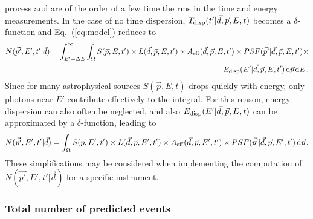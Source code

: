 \documentclass{article}[12pt,a4]
\begin{document}
process and are of the order of a few time the rms in the time and energy measurements.
In the case of no time dispersion, $T_{\rm disp}(t' | \vec{d}, \vec{p}, E, t)$ becomes a $\delta$-function
and Eq.~(\ref{eq:model}) reduces to 
\begin{eqnarray}
N(\vec{p'}, E', t' | \vec{d}) = \int_{E'-\Delta E}^{\infty} \int_{\Omega} 
S(\vec{p}, E, t') \times 
L(\vec{d}, \vec{p}, E, t') \times
A_{\rm eff}(\vec{d}, \vec{p}, E, t') \times
PSF(\vec{p'} | \vec{d}, \vec{p}, E, t') \times \nonumber \\
E_{\rm disp}(E' | \vec{d}, \vec{p}, E, t') 
\, {\rm d}\vec{p} \, {\rm d}E \, .
\end{eqnarray}
Since for many astrophysical sources $S(\vec{p}, E, t)$ drops quickly with energy, only
photons near $E'$ contribute effectively to the integral.
For this reason, energy dispersion can also often be neglected, and also
$E_{\rm disp}(E' | \vec{d}, \vec{p}, E, t)$ can be approximated by a $\delta$-function,
leading to
\begin{equation}
N(\vec{p'}, E', t'| \vec{d}) = \int_{\Omega} 
S(\vec{p}, E', t') \times 
L(\vec{d}, \vec{p}, E', t') \times
A_{\rm eff}(\vec{d}, \vec{p}, E', t') \times
PSF(\vec{p'} | \vec{d}, \vec{p}, E', t') \, {\rm d}\vec{p} \, .
\end{equation}
These simplifications may be considered when implementing the computation of
$N(\vec{p'}, E', t' | \vec{d})$ for a specific instrument.


\subsubsection{Total number of predicted events}
\end{document}
